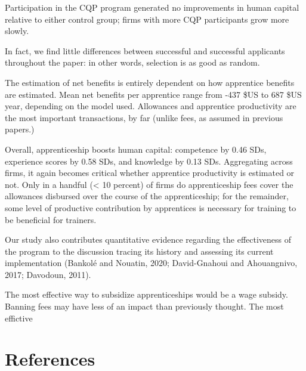 \documentclass[
  11pt,
a4paper
]{article}
\begin{document}
Participation in the CQP program generated no improvements in human capital relative to either control group; firms with more CQP participants grow more slowly.

In fact, we find little differences between successful and successful applicants throughout the paper: in other words, selection is as good as random.

The estimation of net benefits is entirely dependent on how apprentice benefits are estimated. Mean net benefits per apprentice range from -437 \$US to 687 \$US year, depending on the model used. Allowances and apprentice productivity are the most important transactions, by far (unlike fees, as assumed in previous papers.)

Overall, apprenticeship boosts human capital: competence by 0.46 SDs, experience scores by 0.58 SDs, and knowledge by 0.13 SDs. Aggregating across firms, it again becomes critical whether apprentice productivity is estimated or not. Only in a handful (\textless{} 10 percent) of firms do apprenticeship fees cover the allowances disbursed over the course of the apprenticeship; for the remainder, some level of productive contribution by apprentices is necessary for training to be beneficial for trainers.

Our study also contributes quantitative evidence regarding the effectiveness of the program to the discussion tracing its history and assessing its current implementation (Bankolé and Nouatin, 2020; David-Gnahoui and Ahouangnivo, 2017; Davodoun, 2011).

The most effective way to subsidize apprenticeships would be a wage subsidy. Banning fees may have less of an impact than previously thought. The most effictive

\clearpage

\hypertarget{references}{%
\section*{References}\label{references}}

\noindent
\end{document}
